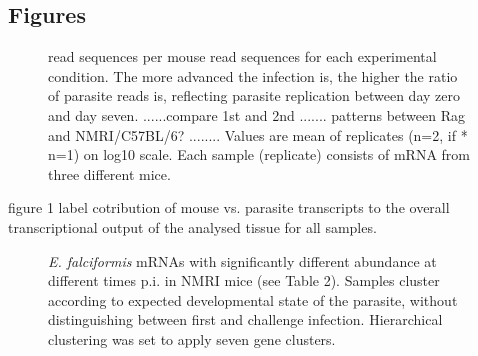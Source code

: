 \documentclass{bmcart}
\begin{document}
\begin{backmatter}

\section*{Figures}

\begin{figure}[h!]
  \caption{
    read sequences per mouse read sequences for each experimental
    condition. The more advanced the infection is, the higher the
    ratio of parasite reads is, reflecting parasite replication
    between day zero and day seven. ......compare 1st and 2nd
    ....... patterns between Rag and NMRI/C57BL/6?  ........ Values
    are mean of replicates (n=2, if * n=1) on log10 scale. Each sample
    (replicate) consists of mRNA from three different mice.}
  \end{figure}

figure 1 label cotribution of mouse vs. parasite transcripts to the
overall transcriptional output of the analysed tissue for all samples.





\begin{figure}[h!]
	\caption{\textit{E. falciformis} mRNAs with significantly
          different abundance at different times p.i. in NMRI mice
          (see Table 2). Samples cluster according to expected
          developmental state of the parasite, without distinguishing
          between first and challenge infection. Hierarchical
          clustering was set to apply seven gene clusters.}
\end{figure}



\end{backmatter}
\end{document}
